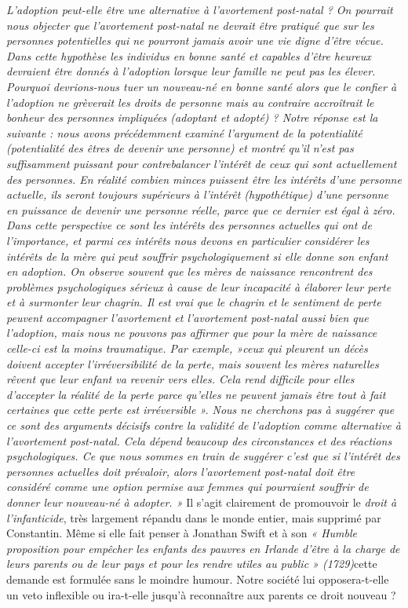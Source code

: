  \emph{L'adoption peut-elle être une alternative à l'avortement post-natal ?
 On pourrait nous objecter que l'avortement post-natal ne devrait être pratiqué que sur les personnes potentielles qui ne pourront jamais avoir une vie digne d'être vécue. Dans cette hypothèse les individus en bonne santé et capables d'être heureux devraient être donnés à l'adoption lorsque leur famille ne peut pas les élever. Pourquoi devrions-nous tuer un nouveau-né en bonne santé alors que le confier à l'adoption ne grèverait les droits de personne mais au contraire accroîtrait le bonheur des personnes impliquées (adoptant et adopté) ? 
 Notre réponse est la suivante : nous avons précédemment examiné l'argument de la potentialité (potentialité des êtres de devenir une personne) et montré qu'il n'est pas suffisamment puissant pour contrebalancer l'intérêt de ceux qui sont actuellement des personnes. En réalité combien minces puissent être les intérêts d'une personne actuelle, ils seront toujours supérieurs à l'intérêt (hypothétique) d'une personne en puissance de devenir une personne réelle, parce que ce dernier est égal à zéro. Dans cette perspective ce sont les intérêts des personnes actuelles qui ont de l'importance, et parmi ces intérêts nous devons en particulier considérer les intérêts de la mère qui peut souffrir psychologiquement si elle donne son enfant en adoption. On observe souvent que les mères de naissance rencontrent des problèmes psychologiques sérieux à cause de leur incapacité à élaborer leur perte et à surmonter leur chagrin. Il est vrai que le chagrin et le sentiment de perte peuvent accompagner l'avortement et l'avortement post-natal aussi bien que l'adoption, mais nous ne pouvons pas affirmer que pour la mère de naissance celle-ci est la moins traumatique. Par exemple, »ceux qui pleurent un décès doivent accepter l'irréversibilité de la perte, mais souvent les mères naturelles rêvent que leur enfant va revenir vers elles. Cela rend difficile pour elles d'accepter la réalité de la perte parce qu'elles ne peuvent jamais être tout à fait certaines que cette perte est irréversible ». 
 Nous ne cherchons pas à suggérer que ce sont des arguments décisifs contre la validité de l'adoption comme alternative à l'avortement post-natal. Cela dépend beaucoup des circonstances et des réactions psychologiques. Ce que nous sommes en train de suggérer c'est que si l'intérêt des personnes actuelles doit prévaloir, alors l'avortement post-natal doit être considéré comme une option permise aux femmes qui pourraient souffrir de donner leur nouveau-né à adopter. »
}
 Il s'agit clairement de promouvoir le \emph{droit à l'infanticide}, très largement répandu dans le monde entier, mais supprimé par Constantin. Même si elle fait penser à Jonathan Swift et à son \emph{« Humble proposition pour empêcher les enfants des pauvres en Irlande d'être à la charge de leurs parents ou de leur pays et pour les rendre utiles au public » (1729)}cette demande est formulée sans le moindre humour. Notre société lui opposera-t-elle un veto inflexible ou ira-t-elle jusqu'à reconnaître aux parents ce droit nouveau ? 
